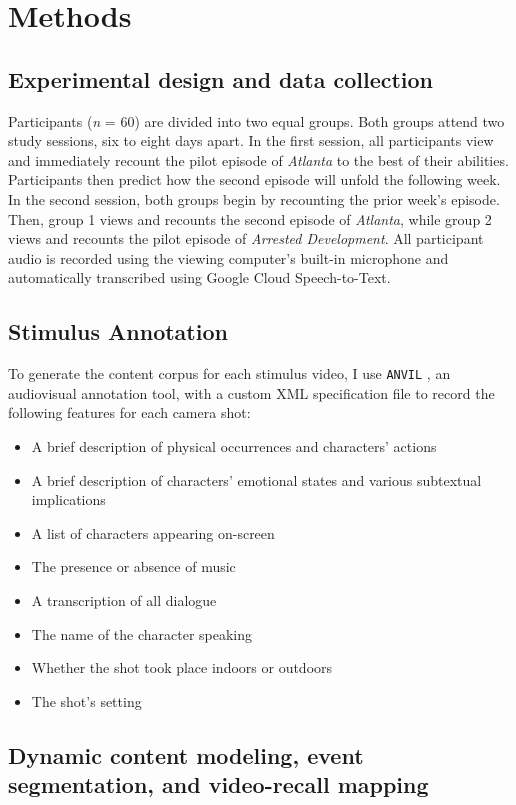 \documentclass{article}
\begin{document}
\section{Methods}
\subsection{Experimental design and data collection}

Participants (\textit{n} = 60) are divided into two equal groups. Both groups attend two study sessions, six to eight days apart.  In the first session, all participants view and immediately recount the pilot episode of \textit{Atlanta} to the best of their abilities. Participants then predict how the second episode will unfold the following week.  In the second session, both groups begin by recounting the prior week's episode.  Then, group 1 views and recounts the second episode of \textit{Atlanta}, while group 2 views and recounts the pilot episode of \textit{Arrested Development}.  All participant audio is recorded using the viewing computer's built-in microphone and automatically transcribed using Google Cloud Speech-to-Text.

\subsection{Stimulus Annotation}

To generate the content corpus for each stimulus video, I use \texttt{ANVIL} \citep{Kipp01}, an audiovisual annotation tool, with a custom XML specification file to record the following features for each camera shot: 
\begin{itemize}
    \item A brief description of physical occurrences and characters' actions
    \item A brief description of characters' emotional states and various subtextual implications
    \item A list of characters appearing on-screen
    \item The presence or absence of music
    \item A transcription of all dialogue
    \item The name of the character speaking
    \item Whether the shot took place indoors or outdoors
    \item The shot's setting
\end{itemize}

\subsection{Dynamic content modeling, event segmentation, and video-recall mapping}
\end{document}
